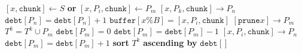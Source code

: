 \documentclass{article}
\begin{document}
\pagestyle{empty}

\newcommand{\send}{\Rightarrow}
\newcommand{\sendto}{\rightarrow}
\algrenewcommand{}

\begin{algorithmic}

  \State $[x,\mathtt{chunk}] \gets S$ \textbf{or} $[x,P_i,\mathtt{chunk}] \gets P_m$
  \State $[x,P_k,\mathtt{chunk}] \sendto P_n$
  \State $\mathtt{debt}[P_n] = \mathtt{debt}[P_n]+1$
  \EndFor
  \EndIf
  \State $\mathtt{buffer}[x \% B] = [x,P_i,\mathtt{chunk}]$
  \Else
  \State $[\mathtt{prune} x] \sendto P_m$
  \EndIf
  \State $T^k = T^k \cup P_m$
  \State $\mathtt{debt}[P_m]=0$
  \Else
  \State $\mathtt{debt}[P_m] = \mathtt{debt}[P_m]-1$
  \EndIf
  \State $[x,P_i,\mathtt{chunk}] \sendto P_n$
  \State $\mathtt{debt}[P_m] = \mathtt{debt}[P_m]+1$
  \EndFor
  \EndIf
  \State \textbf{sort} $T^k$ \textbf{ascending by} $\mathtt{debt[]}$
  \EndWhile
  \EndProcedure
  
\end{algorithmic}
\end{document}
